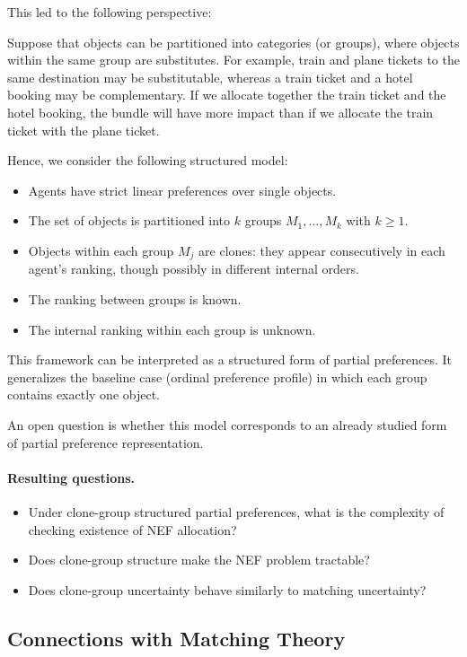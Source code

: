 \documentclass{article}
\begin{document}
This led to the following perspective:

Suppose that objects can be partitioned into categories (or groups), where objects within the same group are substitutes. 
For example, train and plane tickets to the same destination may be substitutable, whereas a train ticket and a hotel booking may be complementary. If we allocate together the train ticket and the hotel booking, the bundle will have more impact than if we allocate the train ticket with the plane ticket.

Hence, we consider the following structured model:
\begin{itemize}
    \item Agents have strict linear preferences over single objects.
    \item The set of objects is partitioned into $k$ groups $M_1, \dots, M_k$ with $k \ge 1$.
    \item Objects within each group $M_j$ are clones: they appear consecutively in each agent's ranking, though possibly in different internal orders.
    \item The ranking between groups is known.
    \item The internal ranking within each group is unknown.
\end{itemize}

This framework can be interpreted as a structured form of partial preferences.
It generalizes the baseline case (ordinal preference profile) in which each group contains exactly one object.

An open question is whether this model corresponds to an already studied form of partial preference representation.

\paragraph{Resulting questions.}
\begin{itemize}
    \item Under clone-group structured partial preferences, what is the complexity of checking existence of NEF allocation?
    \item Does clone-group structure make the NEF problem tractable?
    \item Does clone-group uncertainty behave similarly to matching uncertainty?
\end{itemize}

\subsection*{Connections with Matching Theory}
\end{document}
